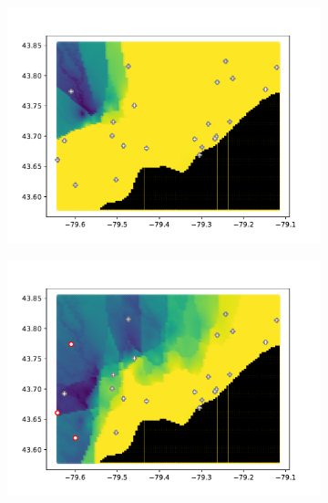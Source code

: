 \begin{figure}[t]
  \begin{subfigure}[b]{0.49\linewidth}
    \centering
    \includegraphics[width=\linewidth]{papers/ieee2022/img/charts/100.pdf}
    \subcaption{}
  \end{subfigure}
  \hfill
  \begin{subfigure}[b]{0.49\linewidth}
    \centering
    \includegraphics[width=\linewidth]{papers/ieee2022/img/charts/800.pdf}
    \subcaption{}
  \end{subfigure}
  \\[0.15cm]
  \begin{subfigure}[b]{0.49\linewidth}
    \centering

\end{subfigure}
\end{figure}
